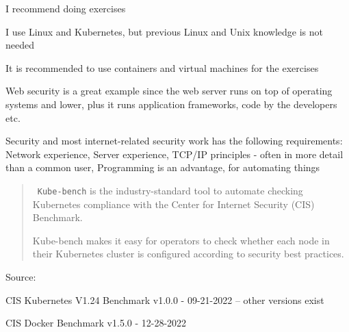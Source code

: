 \documentclass[Screen16to9,17pt]{foils}
\begin{document}
\begin{list2}
\item I recommend doing exercises
\item I use Linux and Kubernetes, but previous Linux and Unix knowledge is not needed
\item It is recommended to use containers and virtual machines for the exercises
\item Web security is a great example since the web server runs on top of operating systems and lower, plus it runs application frameworks, code by the developers etc.

\item Security and most internet-related security work has the following requirements:\\
Network experience, Server experience, TCP/IP principles - often in more detail than a common user, Programming is an advantage, for automating things
\end{list2}



\begin{quote}
\faWrench\ \verb+Kube-bench+ is the industry-standard tool to automate checking Kubernetes compliance with the Center for Internet Security (CIS) Benchmark.

Kube-bench makes it easy for operators to check whether each node in their Kubernetes cluster is configured according to security best practices.
\end{quote}
Source: 

\begin{list2}
\item CIS Kubernetes V1.24 Benchmark v1.0.0 - 09-21-2022 -- other versions exist
\item CIS Docker Benchmark v1.5.0 - 12-28-2022
\end{list2}




\end{document}

